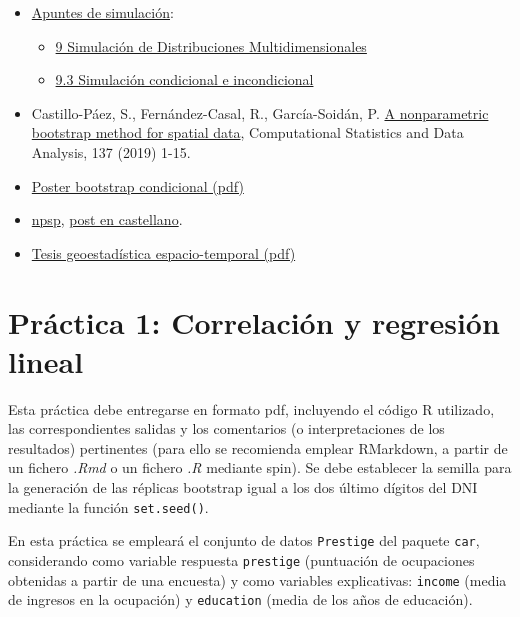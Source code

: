 \documentclass[
]{book}
\theoremstyle{definition}
\theoremstyle{definition}
\theoremstyle{definition}
\theoremstyle{remark}
\begin{document}
\begin{itemize}
\item
  \href{https://rubenfcasal.github.io/simbook}{Apuntes de simulación}:

  \begin{itemize}
  \item
    \href{https://rubenfcasal.github.io/simbook/simulacion-de-distribuciones-multidimensionales.html}{9 Simulación de Distribuciones Multidimensionales}
  \item
    \href{https://rubenfcasal.github.io/simbook/simulacion-de-distribuciones-multidimensionales.html\#simulacion-condicional-e-incondicional}{9.3 Simulación condicional e incondicional}
  \end{itemize}
\item
  Castillo-Páez, S., Fernández-Casal, R., García-Soidán, P.
  \href{https://www.sciencedirect.com/science/article/pii/S0167947319300325?via\%3Dihub}{A nonparametric bootstrap method for spatial data},
  Computational Statistics and Data Analysis, 137 (2019) 1-15.
\item
  \href{./Poster_METMA9_2.pdf}{Poster bootstrap condicional (pdf)}
\item
  \href{https://rubenfcasal.github.io/npsp/index.html}{npsp}, \href{https://rubenfcasal.github.io/post/geoestadistica-no-parametrica-con-el-paquete-npsp/}{post en castellano}.
\item
  \href{https://rubenfcasal.github.io/Geoestadistica_espacio-temporal.pdf}{Tesis geoestadística espacio-temporal (pdf)}
\end{itemize}

\hypertarget{practica1}{%
\chapter{Práctica 1: Correlación y regresión lineal}\label{practica1}}

Esta práctica debe entregarse en formato pdf,
incluyendo el código R utilizado, las correspondientes salidas
y los comentarios (o interpretaciones de los resultados) pertinentes
(para ello se recomienda emplear RMarkdown,
a partir de un fichero \emph{.Rmd} o un fichero \emph{.R} mediante spin).
Se debe establecer la semilla para la generación de las réplicas bootstrap
igual a los dos último dígitos del DNI mediante la función \texttt{set.seed()}.

En esta práctica se empleará el conjunto de datos \texttt{Prestige} del paquete \texttt{car},
considerando como variable respuesta \texttt{prestige} (puntuación de ocupaciones obtenidas
a partir de una encuesta) y como variables explicativas:
\texttt{income} (media de ingresos en la ocupación) y \texttt{education} (media de los años de educación).
\end{document}
